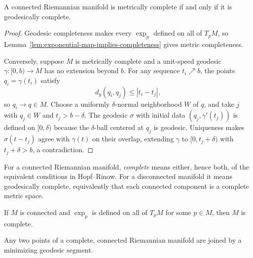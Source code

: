\begin{theorem}
\label{thm:hopf-rinow}




A connected Riemannian manifold is metrically complete if and only if it is
geodesically complete.
\end{theorem}

\begin{proof}

\sketch Geodesic completeness makes every $\exp_p$ defined on all of $T_pM$,
so Lemma~\ref{lem:exponential-map-implies-completeness} gives metric
completeness.

Conversely, suppose $M$ is metrically complete and a unit-speed geodesic
$\gamma\colon[0,b)\to M$ has no extension beyond $b$. For any sequence
$t_i\nearrow b$, the points $q_i=\gamma(t_i)$ satisfy
\[
d_g(q_i,q_j)\leq|t_i-t_j|,
\]
so $q_i\to q\in M$. Choose a uniformly $\delta$-normal neighborhood $W$ of
$q$, and take $j$ with $q_j\in W$ and $t_j>b-\delta$. The geodesic $\sigma$
with initial data $(q_j,\gamma'(t_j))$ is defined on $[0,\delta)$ because the
$\delta$-ball centered at $q_j$ is geodesic. Uniqueness makes
$\sigma(t-t_j)$ agree with $\gamma(t)$ on their overlap, extending $\gamma$
to $[0,t_j+\delta)$ with $t_j+\delta>b$, a contradiction.
\end{proof}

For a connected Riemannian manifold, \emph{complete} means either, hence both,
of the equivalent conditions in Hopf--Rinow. For a disconnected manifold it
means geodesically complete, equivalently that each connected component is a
complete metric space.

\begin{corollary}
\label{cor:exponential-map-defined-implies-complete}





If $M$ is connected and $\exp_p$ is defined on all of $T_pM$ for some
$p\in M$, then $M$ is complete.
\end{corollary}

\begin{corollary}
\label{cor:complete-implies-minimizing-geodesics}

Any two points of a complete, connected Riemannian manifold are joined by a
minimizing geodesic segment.
\end{corollary}

